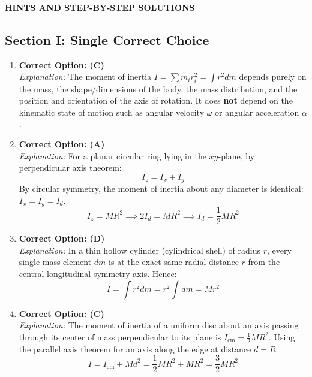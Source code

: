 \documentclass[11pt,a4paper]{article}
\begin{document}
\vspace{15pt}

\begin{tcolorbox}[sectionheader]
  \textbf{\textsf{HINTS AND STEP-BY-STEP SOLUTIONS}}
\end{tcolorbox}
\vspace{8pt}

\subsection*{Section I: Single Correct Choice}

\begin{enumerate}[label=\textbf{Q\arabic*.},leftmargin=24pt,itemsep=10pt]

  \item \textbf{Correct Option: (C)}\\
  \textit{Explanation:} The moment of inertia $I = \sum m_i r_i^2 = \int r^2 dm$ depends purely on the mass, the shape/dimensions of the body, the mass distribution, and the position and orientation of the axis of rotation. It does \textbf{not} depend on the kinematic state of motion such as angular velocity $\omega$ or angular acceleration $\alpha$.

  \item \textbf{Correct Option: (A)}\\
  \textit{Explanation:} For a planar circular ring lying in the $xy$-plane, by perpendicular axis theorem:
  \[
    I_z = I_x + I_y
  \]
  By circular symmetry, the moment of inertia about any diameter is identical: $I_x = I_y = I_d$.
  \[
    I_z = M R^2 \implies 2 I_d = M R^2 \implies I_d = \frac{1}{2} M R^2
  \]

  \item \textbf{Correct Option: (D)}\\
  \textit{Explanation:} In a thin hollow cylinder (cylindrical shell) of radius $r$, every single mass element $dm$ is at the exact same radial distance $r$ from the central longitudinal symmetry axis. Hence:
  \[
    I = \int r^2 dm = r^2 \int dm = M r^2
  \]

  \item \textbf{Correct Option: (C)}\\
  \textit{Explanation:} The moment of inertia of a uniform disc about an axis passing through its center of mass perpendicular to its plane is $I_{\text{cm}} = \frac{1}{2} M R^2$. Using the parallel axis theorem for an axis along the edge at distance $d = R$:
  \[
    I = I_{\text{cm}} + M d^2 = \frac{1}{2} M R^2 + M R^2 = \frac{3}{2} M R^2
  \]


\end{enumerate}
\end{document}
